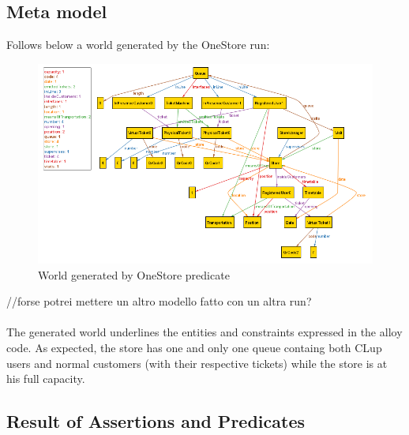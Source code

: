 \documentclass[]{article}
\begin{document}
	
	
	
	\newpage
	\subsection{Meta model}

	Follows below a world generated by the OneStore run:
	
	\begin{figure}[H]
								\centering
								\includegraphics[scale=1.038]{OneStore.png}
								\caption{World generated by OneStore predicate}
	\end{figure}
	
	//forse potrei mettere un altro modello fatto con un altra run? \\ \\
	The generated world underlines the entities and constraints expressed in the alloy code. \newline
	As expected, the store has one and only one queue containg both CLup users and normal customers (with their respective tickets) while the store is at his full capacity.
	\newpage
	\subsection{Result of Assertions and Predicates}
	
\end{document}
